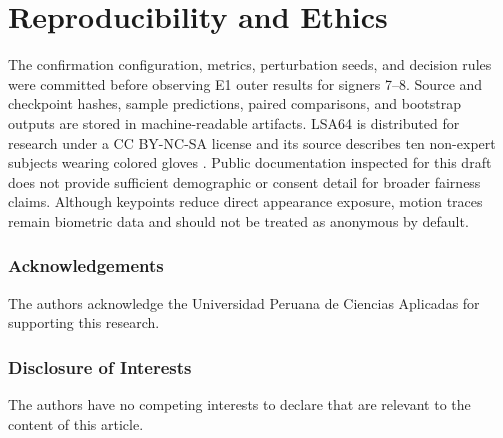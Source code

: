 \section*{Reproducibility and Ethics}

The confirmation configuration, metrics, perturbation seeds, and decision rules
were committed before observing E1 outer results for signers 7--8.  Source and
checkpoint hashes, sample predictions, paired comparisons, and bootstrap outputs
are stored in machine-readable artifacts.  LSA64 is distributed for research under
a CC BY-NC-SA license and its source describes ten non-expert subjects wearing
colored gloves \citep{ronchetti2016lsa64}.  Public documentation inspected for this
draft does not provide sufficient demographic or consent detail for broader fairness
claims.  Although keypoints reduce direct appearance exposure, motion traces remain
biometric data and should not be treated as anonymous by default.

\begin{credits}
\subsubsection{Acknowledgements}
The authors acknowledge the Universidad Peruana de Ciencias Aplicadas for
supporting this research.

\subsubsection{Disclosure of Interests}
The authors have no competing interests to declare that are relevant to the
content of this article.
\end{credits}

